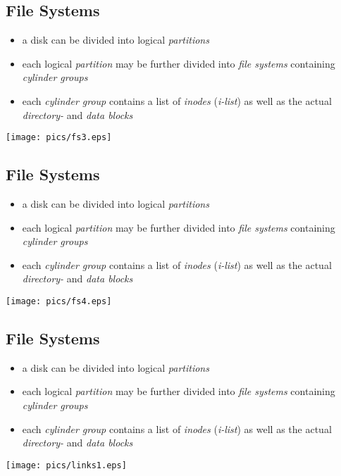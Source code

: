\documentclass[xga]{xdvislides}
\begin{document}
\subsection{File Systems}
\begin{itemize}
	\item a disk can be divided into logical {\em partitions}
	\item each logical {\em partition} may be further divided into
		{\em file systems} containing {\em cylinder groups}
	\item each {\em cylinder group} contains a list of {\em inodes} ({\em i-list})
		as well as the actual {\em directory-} and {\em data blocks}
\end{itemize}
\texttt{[image: pics/fs3.eps]}

\subsection{File Systems}
\begin{itemize}
	\item a disk can be divided into logical {\em partitions}
	\item each logical {\em partition} may be further divided into
		{\em file systems} containing {\em cylinder groups}
	\item each {\em cylinder group} contains a list of {\em inodes} ({\em i-list})
		as well as the actual {\em directory-} and {\em data blocks}
\end{itemize}
\texttt{[image: pics/fs4.eps]}

\subsection{File Systems}
\begin{itemize}
	\item a disk can be divided into logical {\em partitions}
	\item each logical {\em partition} may be further divided into
		{\em file systems} containing {\em cylinder groups}
	\item each {\em cylinder group} contains a list of {\em inodes} ({\em i-list})
		as well as the actual {\em directory-} and {\em data blocks}
\end{itemize}
\texttt{[image: pics/links1.eps]}
\end{document}
